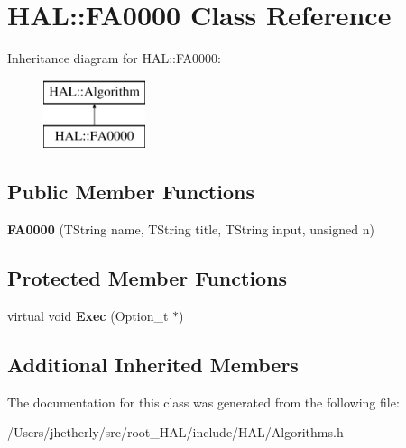 \hypertarget{class_h_a_l_1_1_f_a0000}{\section{H\-A\-L\-:\-:F\-A0000 Class Reference}
\label{class_h_a_l_1_1_f_a0000}
}
Inheritance diagram for H\-A\-L\-:\-:F\-A0000\-:\begin{figure}[H]
\begin{center}
\leavevmode
\includegraphics[height=2.000000cm]{class_h_a_l_1_1_f_a0000}
\end{center}
\end{figure}
\subsection*{Public Member Functions}
\begin{DoxyCompactItemize}
\item 
\hypertarget{class_h_a_l_1_1_f_a0000_aad6722776f282a5c7c371bd3537301a7}{{\bfseries F\-A0000} (T\-String name, T\-String title, T\-String input, unsigned n)}\label{class_h_a_l_1_1_f_a0000_aad6722776f282a5c7c371bd3537301a7}

\end{DoxyCompactItemize}
\subsection*{Protected Member Functions}
\begin{DoxyCompactItemize}
\item 
\hypertarget{class_h_a_l_1_1_f_a0000_a4c52d10b435893775de1226d13f4e4a3}{virtual void {\bfseries Exec} (Option\-\_\-t $\ast$)}\label{class_h_a_l_1_1_f_a0000_a4c52d10b435893775de1226d13f4e4a3}

\end{DoxyCompactItemize}
\subsection*{Additional Inherited Members}


The documentation for this class was generated from the following file\-:\begin{DoxyCompactItemize}
\item 
/\-Users/jhetherly/src/root\-\_\-\-H\-A\-L/include/\-H\-A\-L/Algorithms.\-h\end{DoxyCompactItemize}
